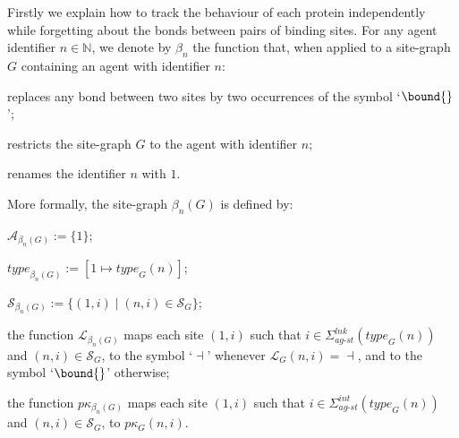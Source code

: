 \documentclass[10pt,a4paper]{llncs}
\newcommand{\bydef}{\stackrel{\scalebox{0.8}{\!\!$\scriptscriptstyle{\triangle}$}}{=}}
\renewcommand{\bydef}{:=}
\newcommand{\linksite}{\signaturesymb^{\textit{lnk}}_{\textit{ag-st}}}
\newcommand{\statesite}{\signaturesymb^{\textit{int}}_{\textit{ag-st}}}
\newcommand{\signaturesymb}{\Sigma}
\newcommand{\graphsymb}{G}
\newcommand{\agents}[1][]{\mathcal{A}_{#1}}
\newcommand{\type}[1][]{\textit{type}_{#1}}
\newcommand{\sites}[1][]{\mathcal{S}_{#1}}
\newcommand{\links}[1][]{\mathcal{L}_{#1}}
\newcommand{\props}[1][]{p\kappa_{#1}}
\newcommand{\free}{\dashv}
\begin{document}
Firstly  we explain how to track the behaviour of each protein independently while forgetting about the bonds between pairs of binding sites.
For any agent identifier $n\in\mathbb{N}$, we denote by $\beta_{n}$ the function that, when  applied to a site-graph $\graphsymb$ containing an agent with identifier $n$: \begin{inparaenum}\item replaces any bond between two sites by two occurrences of the symbol `$\bound{}$'; \item restricts the site-graph $\graphsymb$  to the agent with identifier $n$; \item renames the  identifier $n$ with  $1$.  \end{inparaenum}
More formally, the site-graph $\beta_{n}(\graphsymb)$ is defined by:
\begin{inparaenum}
\item $\agents[\beta_{n}(\graphsymb)]\bydef\{1\}$;
\item $\type[\beta_{n}(\graphsymb)]\bydef[1 \mapsto \type[\graphsymb](n)]$;
\item$\sites[\beta_{n}(\graphsymb)]\bydef\{(1,i)\;|\;(n,i)\in\sites[\graphsymb]\}$;
\item the function $\links[\beta_{n}(\graphsymb)]$ maps each site
$(1,i)$ such that $i\in\linksite(\type[\graphsymb](n))$
and $(n,i)\in\sites[\graphsymb]$, to the symbol `$\free$' whenever
  $\links[\graphsymb](n,i)=\free$, and to the symbol `$\bound{}$' otherwise; \item the function $\props[\beta_{n}(\graphsymb)]$  maps each site $(1,i)$ such that $i\in\statesite(\type[\graphsymb](n))$
and $(n,i)\in\sites[\graphsymb]$, to $\props[\graphsymb](n,i)$.
\end{inparaenum}
\end{document}
